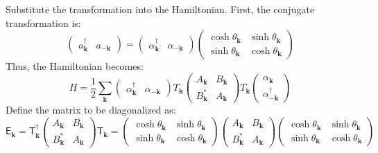 \documentclass[aps, prx, nofootinbib, superscriptaddress]{revtex4-2}
\newcommand{\kvec}{\mathbf{k}}
\begin{document}
Substitute the transformation into the Hamiltonian. First, the conjugate transformation is:
\begin{equation}
    \begin{pmatrix}
        a^{\dagger}_{\kvec} & a_{-\kvec}
    \end{pmatrix}
    =
    \begin{pmatrix}
        \alpha^{\dagger}_{\kvec} & \alpha_{-\kvec}
    \end{pmatrix}
    \begin{pmatrix}
        \cosh \theta_{\kvec} & \sinh \theta_{\kvec} \\
        \sinh \theta_{\kvec} & \cosh \theta_{\kvec}
    \end{pmatrix}
\end{equation}
Thus, the Hamiltonian becomes:
\begin{equation}
    H = \frac{1}{2} \sum_{\kvec}
    \begin{pmatrix}
        \alpha^{\dagger}_{\kvec} & \alpha_{-\kvec}
    \end{pmatrix}
    T_{\kvec}
    \begin{pmatrix}
        A_{\kvec} & B_{\kvec} \\
        B_{\kvec}^{*} & A_{\kvec}
    \end{pmatrix}
    T_{\kvec}
    \begin{pmatrix}
        \alpha_{\kvec} \\
        \alpha^{\dagger}_{-\kvec}
    \end{pmatrix}
\end{equation}
Define the matrix to be diagonalized as:
\begin{equation}
    \mathsf{E}_{\kvec} = \mathsf{T}_{\kvec}^{\dagger}
    \begin{pmatrix}
        A_{\kvec} & B_{\kvec} \\
        B_{\kvec}^{*} & A_{\kvec}
    \end{pmatrix}
    \mathsf{T}_{\kvec}
    =
    \begin{pmatrix}
        \cosh \theta_{\kvec} & \sinh \theta_{\kvec} \\
        \sinh \theta_{\kvec} & \cosh \theta_{\kvec}
    \end{pmatrix}
    \begin{pmatrix}
        A_{\kvec} & B_{\kvec} \\
        B_{\kvec}^{*} & A_{\kvec}
    \end{pmatrix}
    \begin{pmatrix}
        \cosh \theta_{\kvec} & \sinh \theta_{\kvec} \\
        \sinh \theta_{\kvec} & \cosh \theta_{\kvec}
    \end{pmatrix}
\end{equation}
\end{document}
